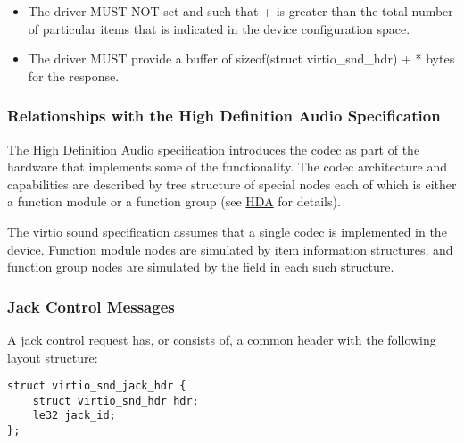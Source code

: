 
\begin{itemize}
\item The driver MUST NOT set  and  such that
 +  is greater than the total number of particular
items that is indicated in the device configuration space.
\item The driver MUST provide a buffer of sizeof(struct virtio_snd_hdr) +
 *  bytes for the response.
\end{itemize}

\subsubsection{Relationships with the High Definition Audio Specification}\label{sec:Device Types / Sound Device / Device Operation / Relationships with HDA}

The High Definition Audio specification introduces the codec as part of the
hardware that implements some of the functionality. The codec architecture and
capabilities are described by tree structure of special nodes each of which is
either a function module or a function group (see \hyperref[intro:HDA]{HDA} for
details).

The virtio sound specification assumes that a single codec is implemented in the
device. Function module nodes are simulated by item information structures,
and function group nodes are simulated by the  field in each
such structure.

\subsubsection{Jack Control Messages}\label{sec:Device Types / Sound Device / Device Operation / Jack Control Messages}

A jack control request has, or consists of, a common header with the following
layout structure:

\begin{lstlisting}
struct virtio_snd_jack_hdr {
    struct virtio_snd_hdr hdr;
    le32 jack_id;
};
\end{lstlisting}

